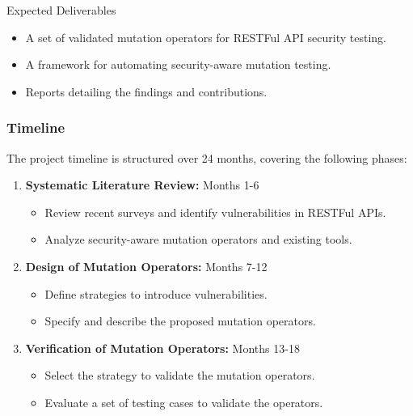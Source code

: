\documentclass[12pt]{beamer}
\theoremstyle{remark}
\theoremstyle{definition}
\begin{document}
\begin{frame}[allowframebreaks]
\begin{block}{Expected Deliverables}
\begin{itemize}
    \item A set of validated mutation operators for RESTFul API security testing.
    \item A framework for automating security-aware mutation testing.
    \item Reports detailing the findings and contributions.
\end{itemize}
\end{block}
\end{frame}


\begin{frame}[allowframebreaks]
\frametitle{Timeline}
The project timeline is structured over 24 months, covering the following phases:

\begin{enumerate}
    \item \textbf{Systematic Literature Review:} Months 1-6
    \begin{itemize}
        \item Review recent surveys and identify vulnerabilities in RESTFul APIs.
        \item Analyze security-aware mutation operators and existing tools.
    \end{itemize}

    \item \textbf{Design of Mutation Operators:} Months 7-12
    \begin{itemize}
        \item Define strategies to introduce vulnerabilities.
        \item Specify and describe the proposed mutation operators.
    \end{itemize}

    \item \textbf{Verification of Mutation Operators:} Months 13-18
    \begin{itemize}
      \item Select the strategy to validate the mutation operators.
      \item Evaluate a set of testing cases to validate the operators.
    \end{itemize}


\end{enumerate}
\end{frame}
\end{document}
